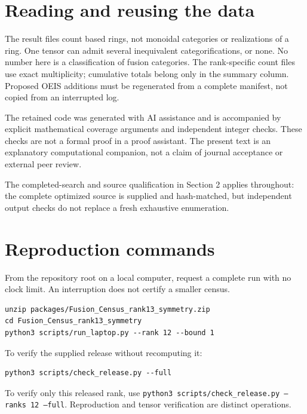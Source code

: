 \documentclass[11pt,a4paper]{article}
\theoremstyle{definition}\newtheorem{definition}[theorem]{Definition}\newtheorem{remark}[theorem]{Remark}
\begin{document}
\section{Reading and reusing the data}
The result files count based rings, not monoidal categories or realizations of
a ring. One tensor can admit several inequivalent categorifications, or none.
No number here is a classification of fusion categories. The rank-specific
count files use exact multiplicity; cumulative totals belong only in the
summary column. Proposed OEIS additions must be regenerated from a complete
manifest, not copied from an interrupted log.

The retained code was generated with AI assistance and is accompanied by explicit
mathematical coverage arguments and independent integer checks. These checks
are not a formal proof in a proof assistant. The present text is an explanatory
computational companion, not a claim of journal acceptance or external peer review.

The completed-search and source qualification in Section 2 applies throughout: the complete optimized source is supplied and hash-matched, but independent output checks do not replace a fresh exhaustive enumeration.

\par\noindent\begin{minipage}{\linewidth}
\section{Reproduction commands}
From the repository root on a local computer, request a complete run with no clock limit. An interruption does not certify a smaller census.
\par\noindent\begin{minipage}{\linewidth}
\begin{lstlisting}
unzip packages/Fusion_Census_rank13_symmetry.zip
cd Fusion_Census_rank13_symmetry
python3 scripts/run_laptop.py --rank 12 --bound 1
\end{lstlisting}
\end{minipage}\par
To verify the supplied release without recomputing it:
\par\noindent\begin{minipage}{\linewidth}
\begin{lstlisting}
python3 scripts/check_release.py --full
\end{lstlisting}
\end{minipage}\par
To verify only this released rank, use \texttt{python3 scripts/check\_release.py --ranks 12 --full}. Reproduction and tensor verification are distinct operations.

\end{minipage}\par
\end{document}
